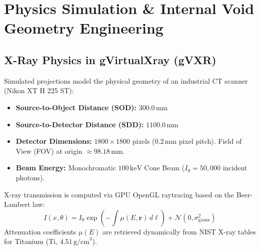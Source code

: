\documentclass[10pt,a4paper]{article}
\begin{document}
\newpage

\section{Physics Simulation \& Internal Void Geometry Engineering}

\begin{minipage}[t]{0.48\textwidth}
\subsection{X-Ray Physics in gVirtualXray (gVXR)}
Simulated projections model the physical geometry of an industrial CT scanner (Nikon XT H 225 ST):
\begin{itemize}[leftmargin=*,noitemsep]
    \item \textbf{Source-to-Object Distance (SOD):} $300.0\,\text{mm}$
    \item \textbf{Source-to-Detector Distance (SDD):} $1100.0\,\text{mm}$
    \item \textbf{Detector Dimensions:} $1800 \times 1800$ pixels ($0.2\,\text{mm}$ pixel pitch). Field of View (FOV) at origin $\approx 98.18\,\text{mm}$.
    \item \textbf{Beam Energy:} Monochromatic $100\,\text{keV}$ Cone Beam ($I_0 = 50{,}000$ incident photons).
\end{itemize}
X-ray transmission is computed via GPU OpenGL raytracing based on the Beer-Lambert law:
\begin{equation}
    I(x, \theta) = I_0 \exp\left( -\int \mu(E, \mathbf{r})\, d\ell \right) + \mathcal{N}(0, \sigma_{\text{gauss}}^2)
\end{equation}
Attenuation coefficients $\mu(E)$ are retrieved dynamically from NIST X-ray tables for Titanium ($\text{Ti}$, $4.51\,\text{g/cm}^3$).
\end{minipage}
\hfill
\end{document}
